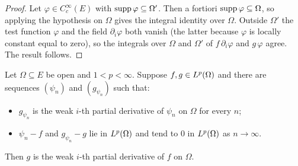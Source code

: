 \begin{proof}
\leanok

Let $\varphi \in C_c^\infty(E)$ with $\operatorname{supp}\varphi \subseteq \Omega'$. Then a
fortiori $\operatorname{supp}\varphi \subseteq \Omega$, so applying the hypothesis on
$\Omega$ gives the integral identity over $\Omega$. Outside $\Omega'$ the test
function $\varphi$ and the field $\partial_i\varphi$ both vanish (the latter
because $\varphi$ is locally constant equal to zero), so the integrals over
$\Omega$ and $\Omega'$ of $f\,\partial_i\varphi$ and $g\,\varphi$ agree. The
result follows.
\end{proof}

\begin{lemma}
\label{lem:weak_lp_closure}
\leanok
{}
Let $\Omega \subseteq E$ be open and $1 < p < \infty$. Suppose $f, g \in
L^{p}(\Omega)$ and there are sequences $(\psi_n)$ and $(g_{\psi_n})$ such that:
\begin{itemize}
  \item $g_{\psi_n}$ is the weak $i$-th partial derivative of $\psi_n$ on
        $\Omega$ for every $n$;
  \item $\psi_n - f$ and $g_{\psi_n} - g$ lie in $L^{p}(\Omega)$ and tend to
        $0$ in $L^{p}(\Omega)$ as $n \to \infty$.
\end{itemize}
Then $g$ is the weak $i$-th partial derivative of $f$ on $\Omega$.
\end{lemma}

